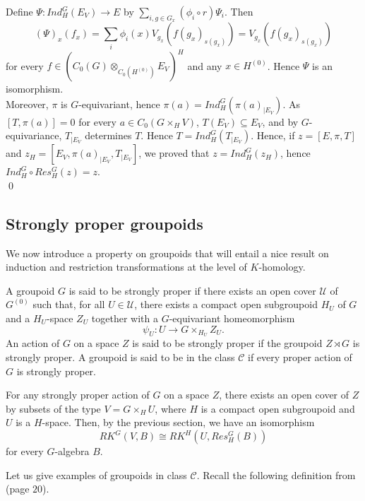 \begin{dem}
Define $\Psi : Ind_H^G (E_V)\rightarrow E$ by $\sum_{i,g\in G_x}(\phi_i\circ r) \Psi_i$. Then 
\[(\Psi)_x(f_x) =  \sum_{i}\phi_i(x)V_{g_x}(f(g_x)_{s(g_x)}) = V_{g_x}(f(g_x)_{s(g_x)})  \]
for every $f\in \left( C_0( G)\otimes_{C_0(H^{(0)})} E_V\right)^H$ and any $x\in H^{(0)}$.  Hence $\Psi$ is an isomorphism.\\ 

Moreover, $\pi$ is $G$-equivariant, hence $\pi(a) = Ind_H^G (\pi(a)_{|E_V} )$. As $[T,\pi(a)]=0$ for every $a\in C_0(G\times_H V)$, $T(E_V)\subseteq E_V$, and by $G$-equivariance, $T_{|E_V}$ determines $T$. Hence $T= Ind_H^G (T_{|E_V})$. Hence, if $z=[E,\pi,T]$ and $z_H =[E_V,\pi(a)_{|E_V},T_{|E_V}]$, we proved that $z = Ind_H^G( z_H)$, hence $Ind_H^G \circ Res_H^G (z)= z$.\\
\qed  
\end{dem}

\subsection{Strongly proper groupoids}

We now introduce a property on groupoids that will entail a nice result on induction and restriction transformations at the level of $K$-homology.

\begin{definition}\label{StronglyProper}
A groupoid $G$ is said to be strongly proper if there exists an open cover $\mathcal U$ of $G^{(0)}$ such that, for all $U\in\mathcal U$, there exists a compact open subgroupoid $H_U$ of $G$ and a $H_U$-space $Z_U$ together with a $G$-equivariant homeomorphism
\[\psi_U : U \rightarrow G\times_{H_U} Z_U.\] 
An action of $G$ on a space $Z$ is said to be strongly proper if the groupoid $Z\rtimes G$ is strongly proper. A groupoid is said to be in the class $\mathcal C$ if every proper action of $G$ is strongly proper.
\end{definition}

\begin{rk}
For any strongly proper action of $G$ on a space $Z$, there exists an open cover of $Z$ by subsets of the type $V=G\times_H U$, where $H$ is a compact open subgroupoid and $U$ is a $H$-space. Then, by the previous section, we have an isomorphism
\[RK^G(V,B)\cong RK^H(U, Res_H^G (B))\]
for every $G$-algebra $B$. 
\end{rk}

Let us give examples of groupoids in class $\mathcal C$. Recall the following definition from \cite{Renault} (page $20$).

